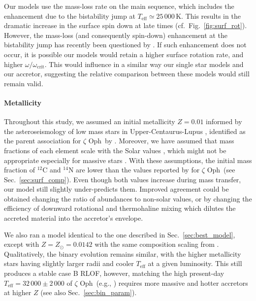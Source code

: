 \documentclass[twocolumn,twocolappendix,trackchanges]{aastex63}
\DeclareRobustCommand{\Figref}[1]{Fig.~\ref{#1}}
\DeclareRobustCommand{\Secref}[1]{Sec.~\ref{#1}}
\newcommand{\zoph}{$\zeta$ Oph}
\begin{document}
Our models use the \cite{vink:00, vink:01} mass-loss rate on the main
sequence, which includes the enhancement due to the bistability jump
at $T_\mathrm{eff}\simeq25\,000\,\mathrm{K}$. This results in the
dramatic increase in the surface spin down at late times (cf.\
\Figref{fig:surf_rot}). However, the mass-loss (and consequently
spin-down) enhancement at the bistability jump has recently been
questioned by \cite{bjorklund:21}. If such enhancement does not occur,
it is possible our models would retain a higher surface rotation rate,
and higher $\omega/\omega_\mathrm{crit}$. This would influence in a
similar way our single star models and our accretor, suggesting the
relative comparison between these models would still remain valid.

\paragraph{Metallicity}
Throughout this study, we assumed an initial metallicity $Z=0.01$
informed by the asteroseismology of low mass stars in
Upper-Centaurus-Lupus \citep[e.g.,][]{murphy:21}, identified as the
parent association for \zoph\ by \cite{neuhauser:20}. Moreover, we
have assumed that mass fractions of each element scale with the Solar
values \citep{grevesse:98}, which might not be appropriate especially
for massive stars \citep[e.g.,][]{grasha:21}. With these assumptions,
the initial mass fraction of $^{12}\mathrm{C}$ and $^{14}\mathrm{N}$
are lower than the values reported by \citetalias{villamariz:05} for
\zoph\ (see \Secref{sec:surf_comp}). Even though both values increase during mass transfer, our
model still slightly under-predicts them. Improved agreement could be
obtained changing the ratio of abundances to non-solar values, or by
changing the efficiency of downward rotational and thermohaline mixing
which dilutes the accreted material into the accretor's envelope.

We also ran a model identical to the one described in
\Secref{sec:best_model}, except with $Z=Z_\odot=0.0142$
\citep{asplund:09} with the same composition scaling from
\cite{grevesse:98}.  Qualitatively, the binary evolution remains
similar, with the higher metallicity stars having slightly larger
radii and cooler $T_\mathrm{eff}$ at a given luminosity. This still
produces a stable case B RLOF, however, matching the high present-day
$T_\mathrm{eff}=32\,000\pm2\,000$ of \zoph\ (e.g.,
) requires more massive and hotter accretors
at higher $Z$ (see also \Secref{sec:bin_param}).
\end{document}
